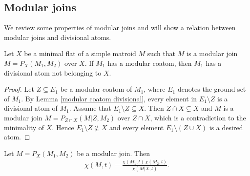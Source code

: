 \subsection{Modular joins}

We review some properties of modular joins and will show a relation between modular joins and divisional atoms.

\begin{Proposition}\label{Ziegler case of modular coatom}
Let $ X $ be a minimal flat of a simple matroid $ M $ such that $ M $ is a modular join $ M = P_{X}(M_{1}, M_{2}) $ over $ X $.
If $ M_{1} $ has a modular coatom, then $ M_{1} $ has a divisional atom not belonging to $ X $.
\end{Proposition}
\begin{proof}
Let $ Z \subseteq E_{1} $ be a modular coatom of $ M_{1} $, where $ E_{1} $ denotes the ground set of $ M_{1} $.
By Lemma \ref{modular coatom divisional}, every element in $ E_{1}\setminus Z $ is a divisional atom of $ M_{1} $.
Assume that $ E_{1}\setminus Z \subseteq X $.
Then $ Z \cap X \subsetneq X $ and $ M $ is a modular join $ M = P_{Z \cap X}(M|Z, M_{2}) $ over $ Z \cap X $, which is a contradiction to the minimality of $ X $.
Hence $ E_{1}\setminus Z \not\subseteq X $ and every element $ E_{1}\setminus(Z \cup X) $ is a desired atom.
\end{proof}

\begin{Theorem}\label{Brylawski decomposition}
Let $ M = P_{X}(M_{1}, M_{2}) $ be a modular join.
Then
\begin{align*}
\chi(M,t) = \frac{\chi(M_{1},t) \, \chi(M_{2},t)}{\chi(M|X,t)}.
\end{align*}
\end{Theorem}

